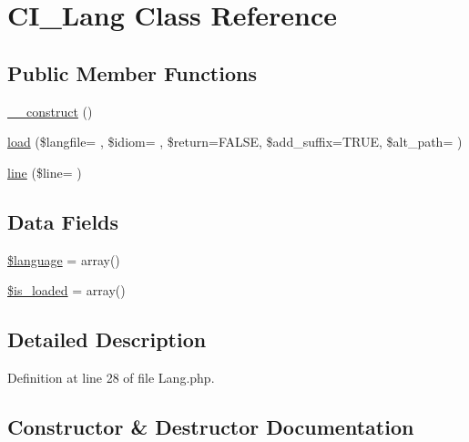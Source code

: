 \hypertarget{class_c_i___lang}{}\section{C\+I\+\_\+\+Lang Class Reference}
\label{class_c_i___lang}
\subsection*{Public Member Functions}
\begin{DoxyCompactItemize}
\item 
\hyperlink{class_c_i___lang_a095c5d389db211932136b53f25f39685}{\+\_\+\+\_\+construct} ()
\item 
\hyperlink{class_c_i___lang_ac7a274e555ce877a6023efaafb2bc0d6}{load} (\$langfile= \textquotesingle{}\textquotesingle{}, \$idiom= \textquotesingle{}\textquotesingle{}, \$return=F\+A\+L\+SE, \$add\+\_\+suffix=T\+R\+UE, \$alt\+\_\+path= \textquotesingle{}\textquotesingle{})
\item 
\hyperlink{class_c_i___lang_ac03038da491fd99a8012a196e8288cd1}{line} (\$line= \textquotesingle{}\textquotesingle{})
\end{DoxyCompactItemize}
\subsection*{Data Fields}
\begin{DoxyCompactItemize}
\item 
\hyperlink{class_c_i___lang_a83170d318260a5a2e2a79dccdd371b10}{\$language} = array()
\item 
\hyperlink{class_c_i___lang_a908e9ad52a5d1956d360689452f6bdbe}{\$is\+\_\+loaded} = array()
\end{DoxyCompactItemize}


\subsection{Detailed Description}


Definition at line 28 of file Lang.\+php.



\subsection{Constructor \& Destructor Documentation}
